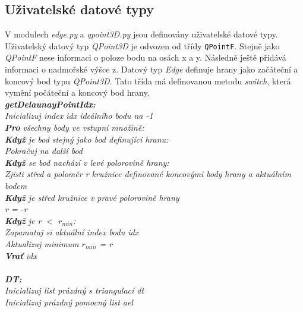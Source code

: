 \documentclass{article}
\begin{document}
\subsection{\small{Uživatelské datové typy}}
V modulech \emph{edge.py} a \emph{qpoint3D.py} jsou definovány uživatelské datové typy. Uživatelský datový typ \emph{QPoint3D} je odvozen od třídy \texttt{QPointF}. Stejně jako \emph{QPointF} nese informaci o poloze bodu na osách x a y. Následně ještě přidává informaci o nadmořské výšce z. 
Datový typ \emph{Edge} definuje hrany jako začáteční a koncový bod typu \emph{QPoint3D}. Tato třída má definovanou metodu \emph{switch}, která vymění počáteční a koncový bod hrany.
\vspace{0,2cm}\\
\indent\textit{\textbf{getDelaunayPointIdx:}}\\
\indent\textit{Inicializuj index idx ideálního bodu na -1}\\
\indent\textit{\textbf{Pro} všechny body ve vstupní množině:}\\
\indent\indent\textit{\textbf{Když} je bod stejný jako bod definující hranu:}\\
\indent\indent\indent\textit{Pokračuj na další bod}\\
\indent\indent\textit{\textbf{Když} se bod nachází v levé polorovině hrany:}\\
\indent\indent\indent\textit{Zjisti střed a poloměr r kružnice definované koncovými body hrany a aktuálním bodem}\\
\indent\indent\indent\textit{\textbf{Když} je střed kružnice v pravé polorovině hrany}\\
\indent\indent\indent\indent\textit{r = -r}\\
\indent\indent\indent\textit{\textbf{Když} je r $<$ $r_{min}$:}\\
\indent\indent\indent\indent\textit{Zapamatuj si aktuální index bodu idx}\\
\indent\indent\indent\indent\textit{Aktualizuj minimum $r_{min}$ = r}\\
\indent\textit{\textbf{Vrať} idx}\\
\vspace{0.2cm}\\
\indent\textit{\textbf{DT:}}\\
\indent\textit{Inicializuj list prázdný s triangulací dt}\\
\indent\textit{Inicializuj prázdný pomocný list ael}\\
\end{document}
